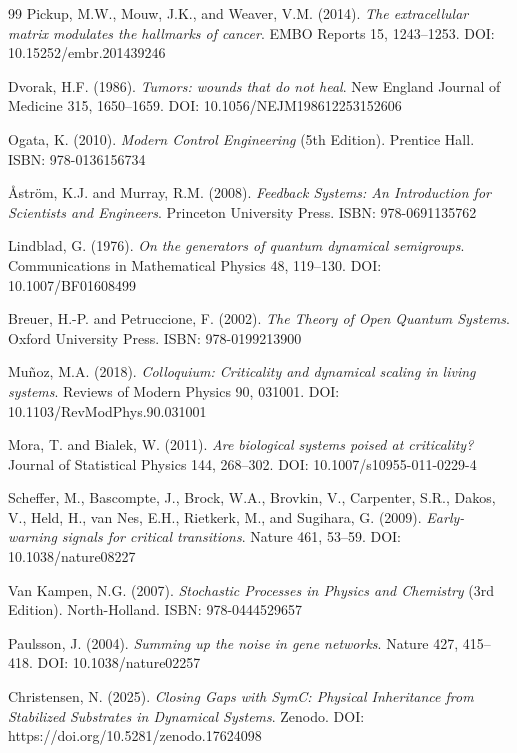 \documentclass[11pt,letterpaper]{article}
\begin{document}
\begin{thebibliography}{99}
Pickup, M.W., Mouw, J.K., and Weaver, V.M. (2014).
\textit{The extracellular matrix modulates the hallmarks of cancer}.
EMBO Reports 15, 1243--1253. DOI: 10.15252/embr.201439246

Dvorak, H.F. (1986).
\textit{Tumors: wounds that do not heal}.
New England Journal of Medicine 315, 1650--1659. DOI: 10.1056/NEJM198612253152606

Ogata, K. (2010).
\textit{Modern Control Engineering} (5th Edition).
Prentice Hall. ISBN: 978-0136156734

Åström, K.J. and Murray, R.M. (2008).
\textit{Feedback Systems: An Introduction for Scientists and Engineers}.
Princeton University Press. ISBN: 978-0691135762

Lindblad, G. (1976).
\textit{On the generators of quantum dynamical semigroups}.
Communications in Mathematical Physics 48, 119--130. DOI: 10.1007/BF01608499

Breuer, H.-P. and Petruccione, F. (2002).
\textit{The Theory of Open Quantum Systems}.
Oxford University Press. ISBN: 978-0199213900

Muñoz, M.A. (2018).
\textit{Colloquium: Criticality and dynamical scaling in living systems}.
Reviews of Modern Physics 90, 031001. DOI: 10.1103/RevModPhys.90.031001

Mora, T. and Bialek, W. (2011).
\textit{Are biological systems poised at criticality?}
Journal of Statistical Physics 144, 268--302. DOI: 10.1007/s10955-011-0229-4

Scheffer, M., Bascompte, J., Brock, W.A., Brovkin, V., Carpenter, S.R., Dakos, V., Held, H., van Nes, E.H., Rietkerk, M., and Sugihara, G. (2009).
\textit{Early-warning signals for critical transitions}.
Nature 461, 53--59. DOI: 10.1038/nature08227

Van Kampen, N.G. (2007).
\textit{Stochastic Processes in Physics and Chemistry} (3rd Edition).
North-Holland. ISBN: 978-0444529657

Paulsson, J. (2004).
\textit{Summing up the noise in gene networks}.
Nature 427, 415--418. DOI: 10.1038/nature02257

Christensen, N. (2025).
\textit{Closing Gaps with SymC: Physical Inheritance from Stabilized Substrates in Dynamical Systems}.
Zenodo. DOI: https://doi.org/10.5281/zenodo.17624098

\end{thebibliography}

\end{document}
